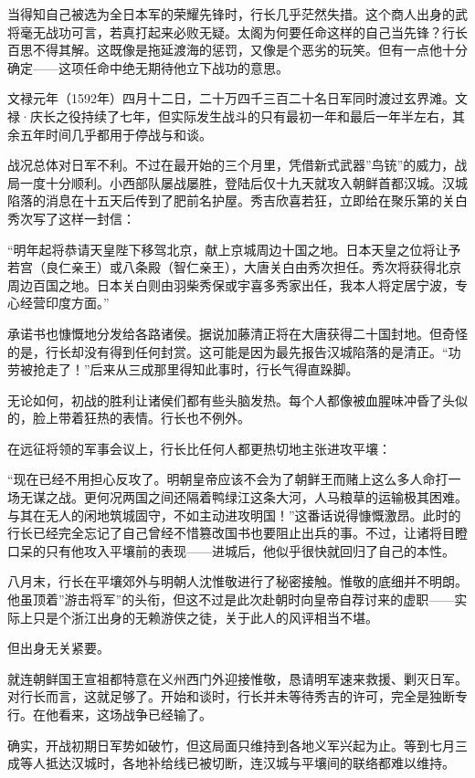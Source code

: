 \documentclass[
]{article}
\begin{document}
当得知自己被选为全日本军的荣耀先锋时，行长几乎茫然失措。这个商人出身的武将毫无战功可言，若真打起来必败无疑。太阁为何要任命这样的自己当先锋？行长百思不得其解。这既像是拖延渡海的惩罚，又像是个恶劣的玩笑。但有一点他十分确定------这项任命中绝无期待他立下战功的意思。

文禄元年（1592年）四月十二日，二十万四千三百二十名日军同时渡过玄界滩。文禄·庆长之役持续了七年，但实际发生战斗的只有最初一年和最后一年半左右，其余五年时间几乎都用于停战与和谈。

战况总体对日军不利。不过在最开始的三个月里，凭借新式武器''鸟铳''的威力，战局一度十分顺利。小西部队屡战屡胜，登陆后仅十九天就攻入朝鲜首都汉城。汉城陷落的消息在十五天后传到了肥前名护屋。秀吉欣喜若狂，立即给在聚乐第的关白秀次写了这样一封信：

``明年起将恭请天皇陛下移驾北京，献上京城周边十国之地。日本天皇之位将让予若宫（良仁亲王）或八条殿（智仁亲王），大唐关白由秀次担任。秀次将获得北京周边百国之地。日本关白则由羽柴秀保或宇喜多秀家出任，我本人将定居宁波，专心经营印度方面。''

承诺书也慷慨地分发给各路诸侯。据说加藤清正将在大唐获得二十国封地。但奇怪的是，行长却没有得到任何封赏。这可能是因为最先报告汉城陷落的是清正。``功劳被抢走了！''后来从三成那里得知此事时，行长气得直跺脚。

无论如何，初战的胜利让诸侯们都有些头脑发热。每个人都像被血腥味冲昏了头似的，脸上带着狂热的表情。行长也不例外。

在远征将领的军事会议上，行长比任何人都更热切地主张进攻平壤：

``现在已经不用担心反攻了。明朝皇帝应该不会为了朝鲜王而赌上这么多人命打一场无谋之战。更何况两国之间还隔着鸭绿江这条大河，人马粮草的运输极其困难。与其在无人的闲地筑城固守，不如主动进攻明国！''这番话说得慷慨激昂。此时的行长已经完全忘记了自己曾经不惜篡改国书也要阻止出兵的事。不过，让诸将目瞪口呆的只有他攻入平壤前的表现------进城后，他似乎很快就回归了自己的本性。

八月末，行长在平壤郊外与明朝人沈惟敬进行了秘密接触。惟敬的底细并不明朗。他虽顶着''游击将军''的头衔，但这不过是此次赴朝时向皇帝自荐讨来的虚职------实际上只是个浙江出身的无赖游侠之徒，关于此人的风评相当不堪。

但出身无关紧要。

就连朝鲜国王宣祖都特意在义州西门外迎接惟敬，恳请明军速来救援、剿灭日军。对行长而言，这就足够了。开始和谈时，行长并未等待秀吉的许可，完全是独断专行。在他看来，这场战争已经输了。

确实，开战初期日军势如破竹，但这局面只维持到各地义军兴起为止。等到七月三成等人抵达汉城时，各地补给线已被切断，连汉城与平壤间的联络都难以维持。
\end{document}
